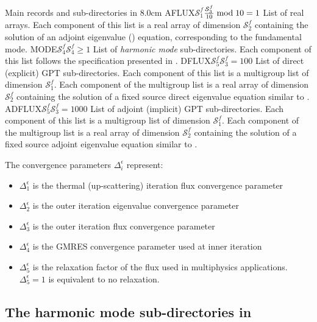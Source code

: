 \begin{DescriptionEnregistrement}{Main records and sub-directories in }{8.0cm}
  {AFLUX}{$\mathcal{S}^{f}_{1}$}{${\mathcal{S}^{f}_{3}\over 10} \bmod 10 = 1$}
  {List of real arrays. Each component of this list is a real array of dimension $\mathcal{S}^{f}_{2}$
  containing the solution of an adjoint eigenvalue () equation,
  corresponding to the fundamental mode.}
\OptDirlEnr
  {MODE}{$\mathcal{S}^{f}_{4}$}{$\mathcal{S}^{f}_{4}\ge 1$}
  {List of {\sl harmonic mode} sub-directories. Each component of this list follows
  the specification presented in .}
\OptDirlEnr
  {DFLUX}{$\mathcal{S}^{f}_{5}$}{$\mathcal{S}^{f}_{3}=100$}
  {List of direct (explicit) GPT sub-directories. Each component of this list is a multigroup list of
  dimension $\mathcal{S}^{f}_{1}$. Each component of the multigroup list is a real array of dimension
  $\mathcal{S}^{f}_{2}$ containing the solution of a fixed source direct eigenvalue equation similar to .}
\OptDirlEnr
  {ADFLUX}{$\mathcal{S}^{f}_{5}$}{$\mathcal{S}^{f}_{3}=1000$}
  {List of adjoint (implicit) GPT sub-directories. Each component of this list is a multigroup list of
  dimension $\mathcal{S}^{f}_{1}$. Each component of the multigroup list is a real array of dimension
  $\mathcal{S}^{f}_{2}$ containing the solution of a fixed source adjoint eigenvalue equation similar to .}
\end{DescriptionEnregistrement}

The convergence parameters $\Delta_i^\epsilon$ represent:
\begin{itemize}
\item $\Delta_1^\epsilon$ is the thermal (up-scattering) iteration flux convergence parameter
\item $\Delta_2^\epsilon$ is the outer iteration eigenvalue convergence parameter
\item $\Delta_3^\epsilon$ is the outer iteration flux convergence parameter
\item $\Delta_4^\epsilon$ is the GMRES convergence parameter used at inner iteration
\item $\Delta_5^\epsilon$ is the relaxation factor of the flux used in multiphysics applications. $\Delta_5^\epsilon=1$ is equivalent to no
relaxation.
\end{itemize}
\goodbreak

\subsection{The harmonic mode sub-directories in }\label{sect:mode_spec}

